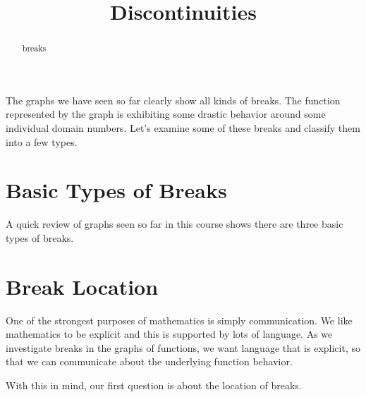 \documentclass{ximera}
\title{Discontinuities}
\begin{document}
\begin{abstract}
breaks
\end{abstract}
\maketitle



The graphs we have seen so far clearly show all kinds of breaks.  The function represented by the graph is exhibiting some drastic behavior around some individual domain numbers.  Let's examine some of these breaks and classify them into a few types.







\section{Basic Types of Breaks}

A quick review of graphs seen so far in this course shows there are three basic types of breaks.



\begin{image}
\end{image}






\section{Break Location}
One of the strongest purposes of mathematics is simply communication.  We like mathematics to be explicit and this is supported by lots of language. As we investigate breaks in the graphs of functions, we want language that is explicit, so that we can communicate about the underlying function behavior.

With this in mind, our first question is about the location of breaks. 
\end{document}
